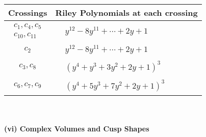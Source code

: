 \documentclass[1p]{elsarticle_modified}
\theoremstyle{definition}
\begin{document}
\begin{tabular}{m{50pt}|m{274pt}}
Crossings & \hspace{64pt}Riley Polynomials at each crossing \\
\hline $$\begin{aligned}c_{1},c_{4},c_{5}\\c_{10},c_{11}\end{aligned}$$&$\begin{aligned}
&y^{12}-8 y^{11}+\cdots+2 y+1
\end{aligned}$\\
\hline $$\begin{aligned}c_{2}\end{aligned}$$&$\begin{aligned}
&y^{12}-8 y^{11}+\cdots+2 y+1
\end{aligned}$\\
\hline $$\begin{aligned}c_{3},c_{8}\end{aligned}$$&$\begin{aligned}
&(y^4+y^3+3 y^2+2 y+1)^3
\end{aligned}$\\
\hline $$\begin{aligned}c_{6},c_{7},c_{9}\end{aligned}$$&$\begin{aligned}
&(y^4+5 y^3+7 y^2+2 y+1)^3
\end{aligned}$\\
\hline
\end{tabular}\\~\\
\newpage\flushleft \textbf{(vi) Complex Volumes and Cusp Shapes}
\end{document}
